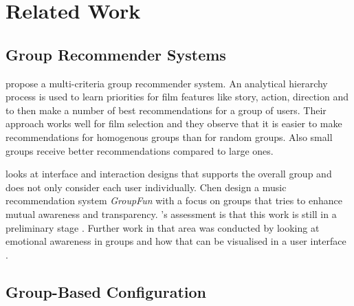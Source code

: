 \chapter{Related Work}
\label{ch:Related_Work}

\section{Group Recommender Systems}
\label{sec:Related_Work:GroupRecommender}

\begin{description}[style=unboxed, leftmargin=0cm, font=\normalfont]
    \item[\citeauthor{choudharyMulticriteriaGroupRecommender2020}] propose a multi-criteria group recommender system. An analytical hierarchy process is used to learn priorities for film features like story, action, direction and to then make a number of best recommendations for a group of users. Their approach works well for film selection and they observe that it is easier to make recommendations for homogenous groups than for random groups. Also small groups receive better recommendations compared to large ones\cite{choudharyMulticriteriaGroupRecommender2020}.

    \item[\citeauthor{chenInterfaceInteractionDesign2011}] looks at interface and interaction designs that supports the overall group and does not only consider each user individually. Chen design a music recommendation system \emph{GroupFun} with a focus on groups that tries to enhance mutual awareness and transparency. \citeauthor{chenInterfaceInteractionDesign2011}'s assessment is that this work is still in a preliminary stage  \cite{chenInterfaceInteractionDesign2011}. Further work in that area was conducted by \citeauthor{chenEmpatheticonsDesigningEmotion2014} looking at emotional awareness in groups and how that can be visualised in a user interface \cite{chenEmpatheticonsDesigningEmotion2014}. 
\end{description}

\section{Group-Based Configuration}
\label{sec:Related_Work:GroupBasedConfiguration}

